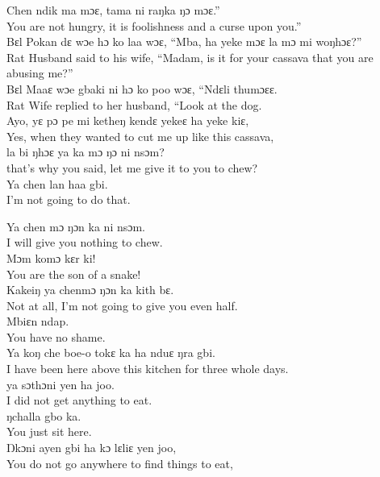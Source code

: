 Chen ndik ma mɔɛ, tama ni raŋka ŋɔ mɔɛ.”\\
You are not hungry, it is foolishness and a curse upon you.”\\

Bɛl Pokan dɛ wɔe hɔ ko laa wɔɛ, “Mba, ha yeke mɔɛ la mɔ mi woŋhɔɛ?”\\
Rat Husband said to his wife, “Madam, is it for your cassava that you are abusing me?”\\

Bɛl Maaɛ wɔe gbaki ni hɔ ko poo wɔɛ, “Ndɛli thumɔɛɛ.\\
Rat Wife replied to her husband, “Look at the dog.\\

Ayo, yɛ pɔ pe mi ketheŋ kendɛ yekeɛ ha yeke kiɛ,\\
Yes, when they wanted to cut me up like this cassava,\\

la bi ŋhɔɛ ya ka mɔ ŋɔ ni nsɔm?\\
that’s why you said, let me give it to you to chew?\\

Ya chen lan haa gbi.\\
I’m not going to do that.
\newpage

Ya chen mɔ ŋɔn ka ni nsɔm.\\
I will give you nothing to chew.\\

Mɔm komɔ kɛr ki!\\
You are the son of a snake!\\

Kakeiŋ ya chenmɔ ŋɔn ka kith bɛ.\\
Not at all, I’m not going to give you even half.\\

Mbiɛn ndap.\\
You have no shame.\\

Ya koŋ che boe-o tokɛ ka ha nduɛ ŋra gbi.\\
I have been here above this kitchen for three whole days.\\

ya sɔthɔni yen ha joo.\\
I did not get anything to eat.\\

ŋchalla gbo ka.\\
You just sit here.\\

Ŋkɔni ayen gbi ha kɔ lɛliɛ yen joo,\\
You do not go anywhere to find things to eat,\\

